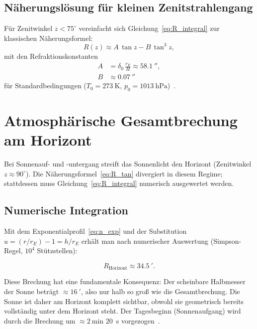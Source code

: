 ﻿\documentclass[12pt,a4paper]{article}
\begin{document}
\subsection{Näherungslösung für kleinen Zenitstrahlengang}

Für Zenitwinkel $z < 75^{\circ}$ vereinfacht sich Gleichung~\eqref{eq:R_integral}
zur klassischen Näherungsformel:
\begin{equation}
  R(z) \approx A\,\tan z - B\,\tan^{3} z,
  \label{eq:R_tan}
\end{equation}
mit den Refraktionskonstanten
\begin{align}
  A &= \delta_0\,\frac{r_E}{H} \approx \SI{58.1}{\arcsecond}, \\
  B &\approx \SI{0.07}{\arcsecond}
\end{align}
für Standardbedingungen ($T_0 = \SI{273}{\kelvin}$,
$p_0 = \SI{1013}{\hecto\pascal}$)~\citep{Meeus1991}.

\section{Atmosphärische Gesamtbrechung am Horizont}
\label{sec:brechung_horizont}

Bei Sonnenauf- und -untergang streift das Sonnenlicht den Horizont
(Zenitwinkel $z \approx 90^{\circ}$).
Die Näherungsformel~\eqref{eq:R_tan} divergiert in diesem Regime;
stattdessen muss Gleichung~\eqref{eq:R_integral} numerisch ausgewertet
werden.

\subsection{Numerische Integration}

Mit dem Exponentialprofil~\eqref{eq:n_exp} und
der Substitution $u = (r/r_E) - 1 = h/r_E$ erhält man
nach numerischer Auswertung (Simpson-Regel, $10^4$ Stützstellen):

\begin{equation}
  R_{\text{Horizont}} \approx \SI{34.5}{\arcminute}.
  \label{eq:R_horizont}
\end{equation}

Diese Brechung hat eine fundamentale Konsequenz:
Der scheinbare Halbmesser der Sonne beträgt $\approx \SI{16}{\arcminute}$,
also nur halb so groß wie die Gesamtbrechung.
Die Sonne ist daher am Horizont komplett sichtbar,
obwohl sie geometrisch bereits vollständig unter dem Horizont steht.
Der Tagesbeginn (Sonnenaufgang) wird durch die Brechung um
$\approx \SI{2}{\minute}$ \SI{20}{\second} vorgezogen~\citep{Meeus1991}.
\end{document}

